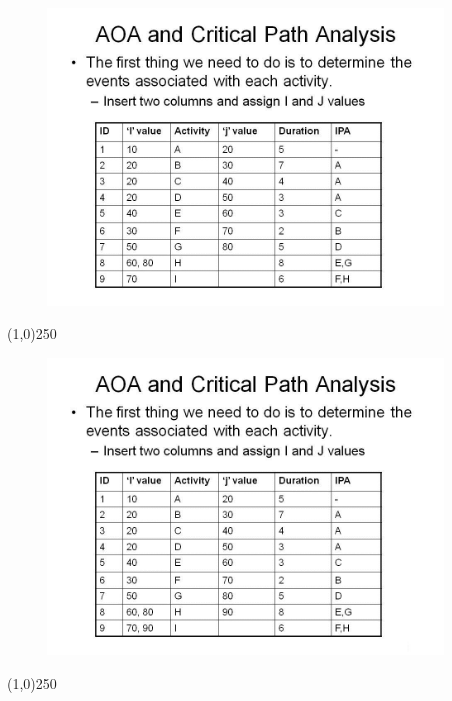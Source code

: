 \begin{frame}
\begin{figure}
	\centering
		\includegraphics[width = 10.5cm]{oldnotes/Slide75.jpg}
\end{figure}
\end{frame}
\begin{center}\line(1,0){250}\end{center}


\begin{frame}
\begin{figure}
	\centering
		\includegraphics[width = 10.5cm]{oldnotes/Slide76.jpg}
\end{figure}
\end{frame}
\begin{center}\line(1,0){250}\end{center}


